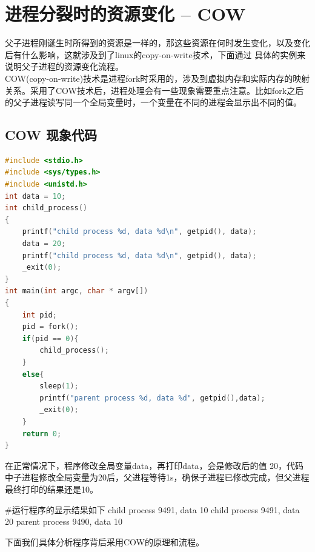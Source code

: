 \section{进程分裂时的资源变化 -- COW}
父子进程刚诞生时所得到的资源是一样的，那这些资源在何时发生变化，以及变化后有什么影响，这就涉及到了linux的copy-on-write技术，下面通过 具体的实例来说明父子进程的资源变化流程。\\
COW(copy-on-write)技术是进程fork时采用的，涉及到虚拟内存和实际内存的映射关系。采用了COW技术后，进程处理会有一些现象需要重点注意。比如fork之后的父子进程读写同一个全局变量时，一个变量在不同的进程会显示出不同的值。
\subsection{COW 现象代码}
\begin{lstlisting}[language={C}]
#include <stdio.h>
#include <sys/types.h>
#include <unistd.h>
int data = 10;
int child_process()
{
    printf("child process %d, data %d\n", getpid(), data);
    data = 20;
    printf("child process %d, data %d\n", getpid(), data);
    _exit(0);
}
int main(int argc, char * argv[])
{
    int pid;
    pid = fork();
    if(pid == 0){
        child_process();
    }
    else{
        sleep(1);
        printf("parent process %d, data %d", getpid(),data);
        _exit(0);
    }
    return 0;
}
\end{lstlisting}
在正常情况下，程序修改全局变量data，再打印data，会是修改后的值 20，代码中子进程修改全局变量为20后，父进程等待1s，确保子进程已修改完成，但父进程最终打印的结果还是10。
\begin{latexcmd}[label= COW现象]
#运行程序的显示结果如下
child process 9491, data 10
child process 9491, data 20
parent process 9490, data 10
\end{latexcmd}

下面我们具体分析程序背后采用COW的原理和流程。\\
